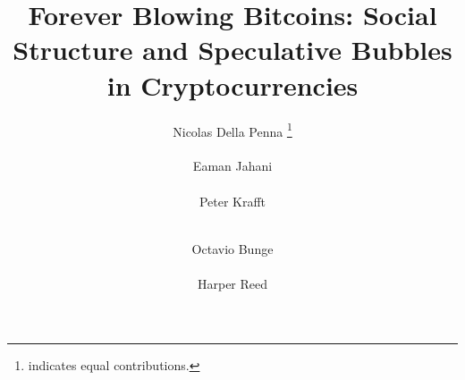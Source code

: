\documentclass{acm_proc_article_sp}%
\begin{document}
\title{Forever Blowing Bitcoins: Social Structure and Speculative Bubbles in Cryptocurrencies}

%
\author{
%
%
\alignauthor
Nicolas Della Penna \thanks{indicates equal contributions.}\\
       \\
\alignauthor
Eaman Jahani \footnotemark[1] \\
        \\
\alignauthor
Peter Krafft \\%
        \\
\and  %
\alignauthor
Octavio Bunge \\%
        \\
\alignauthor 
Harper Reed \\%
}
\end{document}
